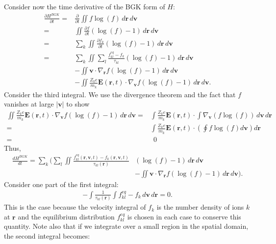 \documentclass{article}
\begin{document}
Consider now the time derivative of the BGK form of $H$:
\begin{align*}
\frac{\partial  H^{BGK}}{\partial t}=&\frac{\partial}{\partial t}\iint f\log(f)\,d\mathbf{r}\,d\mathbf{v}\\
=&\iint \frac{\partial f}{\partial t}(\log(f)-1)\,d\mathbf{r}\,d\mathbf{v}\\
=&\sum_k\iint \frac{\partial f_k}{\partial t}(\log(f)-1)\,d\mathbf{r}\,d\mathbf{v}\\
=&\sum_k \iint \sum_l \frac{f_{kl}^{eq}-f_k}{\tau_{kl}}(\log(f)-1)\,d\mathbf{r}\,d\mathbf{v}\\
&-\iint \mathbf{v}\cdot \nabla_\mathbf{r}f(\log(f)-1)\,d\mathbf{r}\,d\mathbf{v}\\
&-\iint \frac{Z_ke}{m_k}\mathbf{E}(\mathbf{r},t)\cdot \nabla_\mathbf{v}f(\log(f)-1)\,d\mathbf{r}\,d\mathbf{v}.
\end{align*}
Consider the third integral. We use the divergence theorem and the fact that $f$ vanishes at large $|\mathbf{v}|$ to show
\begin{align*}
\iint \frac{Z_k e}{m_k}\mathbf{E}(\mathbf{r},t)\cdot \nabla_\mathbf{v}f(\log(f)-1)\,d\mathbf{r}\,d\mathbf{v}=&\int \frac{Z_ke}{m_k}\mathbf{E}(\mathbf{r},t)\cdot \int \nabla_\mathbf{v}(f\log(f))\,d\mathbf{v}\,d\mathbf{r}\\
=&\int \frac{Z_k e}{m_k}\mathbf{E}(\mathbf{r},t)\cdot \left(\oint f\log(f) d\mathbf{v}\right)d\mathbf{r}\\
=&\:\:0
\end{align*}
Thus,
\begin{align*}\frac{d H^{BGK}}{dt}=\sum_k\bigg(\sum_l\iint \frac{f_{kl}^{eq}(\mathbf{r},\mathbf{v},t)-f_k(\mathbf{r},\mathbf{v},t)}{\tau_{kl}(\mathbf{r})}&(\log(f)-1)\,d\mathbf{r}\,d\mathbf{v}\\&-\iint \mathbf{v}\cdot \nabla_\mathbf{r}f(\log(f)-1)\,d\mathbf{r}\,d\mathbf{v}\bigg).
\end{align*}
Consider one part of the first integral:
\begin{align*}
 -\int\frac{1}{\tau_{kl}(\mathbf{r})}\int f_{kl}^{eq}-f_k\,d\mathbf{v}\,d\mathbf{r}=0.
\end{align*}
This is the case because the velocity integral of $f_k$ is the number density of ions $k$ at $\mathbf{r}$ and the equilibrium distribution $f_{kl}^{eq}$ is chosen in each case to conserve this quantity. Note also that if we integrate over a small region in the spatial domain, the second integral becomes:
\end{document}
